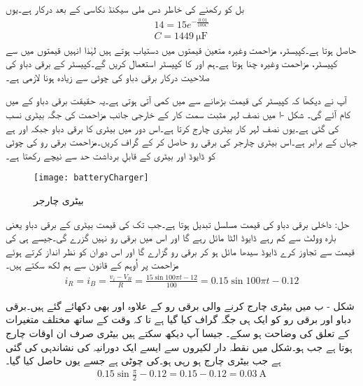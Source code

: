 بل کو  رکھنے کی خاطر دس ملی سیکنڈ نکاسی کے بعد  درکار ہے۔یوں
\begin{align*}
14=15 e^{-\frac{0.01}{100 C}}\\
C=\SI{1449}{\micro \farad}
\end{align*}
حاصل ہوتا ہے۔کپیسٹر، مزاحمت وغیرہ متعین قیمتوں میں دستیاب ہوتے ہیں لہٰذا انہیں قیمتوں میں سے کپیسٹر، مزاحمت وغیرہ چنا ہوتا ہے۔ہم  اور  کا کپیسٹر استعمال کریں گے۔کپیسٹر کے برقی دباو کی صلاحیت درکار برقی دباو کی چوٹی سے زیادہ ہونا لازمی ہے۔ 

آپ نے دیکھا کہ کپیسٹر کی قیمت بڑھانے سے  میں کمی آتی ہوتی ہے۔یہ حقیقت برقی دباو کے  میں کام آئے گی۔
شکل -ا میں نصف لہر مثبت سمت کار کے خارجی جانب مزاحمت کی جگہ  بیٹری نسب کی گئی ہے۔یوں نصف لہر کار بیٹری چارج کرتا ہے۔اس دور میں بیٹری کا برقی دباو  جبکہ  اور  ہے جہاں  کے برابر ہے۔اس بیٹری چارجر کی برقی رو  حاصل کر کے گراف کریں۔مزاحمت  برقی رو کی چوٹی کو ڈایوڈ اور بیٹری کے قابلِ برداشت حد سے نیچے رکھتا ہے۔
\begin{figure}
\centering
\texttt{[image: batteryCharger]}
\caption{بیٹری چارجر}
\label{شکل_بیٹری_چارجر}
\end{figure}
حل:	داخلی برقی دباو  کی قیمت مسلسل تبدیل ہوتا ہے۔جب تک  کی قیمت بیٹری کے برقی دباو یعنی بارہ وولٹ سے کم رہے ڈایوڈ الٹا مائل رہے گا اور اس میں برقی رو نہیں گزرے گی۔جیسے ہی  کی قیمت   سے تجاوز کرے ڈایوڈ سیدھا مائل ہو کر برقی رو گزارے گا اور اس دوران   کو نظر انداز کرتے ہوئے مزاحمت پر  اُوہم کے قانون سے ہم لکھ سکتے ہیں۔
\begin{align*}
i_R=i_B=\frac{v_i-V_B}{R}=\frac{15 \sin 100 \pi t -12 }{100}=0.15 \sin  100 \pi t -0.12
\end{align*}

شکل   - ب میں بیٹری چارج کرنے والی برقی رو  کے علاوہ  اور  بھی دکھائے گئے ہیں۔برقی دباو اور برقی رو کو ایک ہی جگہ گراف کیا گیا ہے تا کہ وقت  کے ساتھ مختلف متغیرات کے تعلق کی وضاحت ہو سکے۔ جیسا آپ دیکھ سکتے ہیں بیٹری صرف ان اوقات چارج ہوتا ہے جب  ہو۔شکل میں نقطہ دار لکیروں سے ایسے ایک دورانیہ کی نشاندہی کی گئی ہے  جب بیٹری چارج ہو رہی ہو۔کی چوٹی  ہے جسے  یوں حاصل کیا گیا۔
\begin{align*}
0.15 \sin \frac{\pi}{2}-0.12=0.15-0.12=\SI{0.03}{\ampere}
\end{align*}

